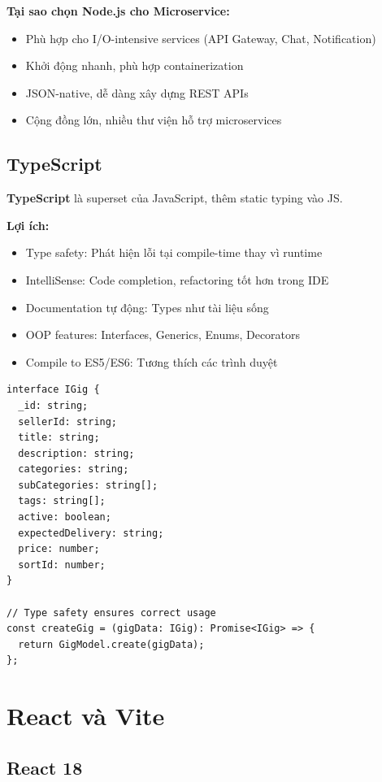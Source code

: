 \documentclass[12pt]{extreport}
\begin{document}
\textbf{Tại sao chọn Node.js cho Microservice:}
\begin{itemize}
    \item Phù hợp cho I/O-intensive services (API Gateway, Chat, Notification)
    \item Khởi động nhanh, phù hợp containerization
    \item JSON-native, dễ dàng xây dựng REST APIs
    \item Cộng đồng lớn, nhiều thư viện hỗ trợ microservices
\end{itemize}

\subsection{TypeScript}

\textbf{TypeScript} là superset của JavaScript, thêm static typing vào JS.

\textbf{Lợi ích:}
\begin{itemize}
    \item Type safety: Phát hiện lỗi tại compile-time thay vì runtime
    \item IntelliSense: Code completion, refactoring tốt hơn trong IDE
    \item Documentation tự động: Types như tài liệu sống
    \item OOP features: Interfaces, Generics, Enums, Decorators
    \item Compile to ES5/ES6: Tương thích các trình duyệt
\end{itemize}

\begin{lstlisting}[style=TypeScriptStyle, caption={Ví dụ TypeScript Interface}]
interface IGig {
  _id: string;
  sellerId: string;
  title: string;
  description: string;
  categories: string;
  subCategories: string[];
  tags: string[];
  active: boolean;
  expectedDelivery: string;
  price: number;
  sortId: number;
}

// Type safety ensures correct usage
const createGig = (gigData: IGig): Promise<IGig> => {
  return GigModel.create(gigData);
};
\end{lstlisting}

\section{React và Vite}

\subsection{React 18}
\end{document}
